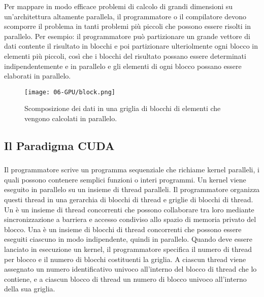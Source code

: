 Per mappare in modo efficace problemi di calcolo di grandi dimensioni su un'architettura altamente parallela, il programmatore o il compilatore devono scomporre il problema in tanti problemi più piccoli che possono essere risolti in parallelo. Per esempio: il programmatore può partizionare un grande vettore di dati contente il risultato in blocchi e poi partizionare ulteriolmente ogni blocco in elementi più piccoli, così che i blocchi del risultato possano essere determinati indipendentemente e in parallelo e gli elementi di ogni blocco possano essere elaborati in parallelo. 

\begin{figure}[h]
    \centering
    \texttt{[image: 06-GPU/block.png]}
    \caption{Scomposizione dei dati in una griglia di blocchi di elementi che vengono calcolati in parallelo.}
\end{figure}

\subsection{Il Paradigma CUDA}



\subsubsection{}

Il programmatore scrive un programma sequenziale che richiame kernel paralleli, i quali possono contenere semplici funzioni o interi programmi. Un kernel viene eseguito in parallelo su un insieme di thread paralleli. Il programmatore organizza questi thread in una gerarchia di blocchi di thread e griglie di blocchi di thread. Un  è un insieme di thread concorrenti che possono collaborare tra loro mediante sincronizzazione a barriera e accesso condiviso allo spazio di memoria privato del blocco. Una  è un insieme di blocchi di thread concorrenti che possono essere eseguiti ciascuno in modo indipendente, quindi in parallelo. Quando deve essere lanciato in esecuzione un kernel, il programmatore specifica il numero di thread per blocco e il numero di blocchi costituenti la griglia. A ciascun thread viene assegnato un numero identificativo univoco all'interno del blocco di thread che lo contiene, e a ciascun blocco di thread un numero di blocco univoco all'interno della sua griglia.

